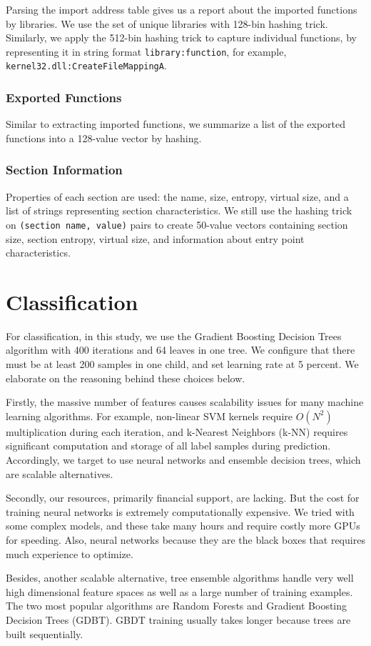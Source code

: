 Parsing the import address table gives us a report about the imported functions by libraries. We use the set of unique libraries with 128-bin hashing trick. Similarly, we apply the 512-bin hashing trick to capture individual functions, by representing
it in string format \verb|library:function|, for example, \verb|kernel32.dll:CreateFileMappingA|.

\subsubsection{Exported Functions}

Similar to extracting imported functions, we summarize a list of the exported functions into a 128-value vector by hashing.

\subsubsection{Section Information}

Properties of each section are used: the name, size, entropy, virtual size, and a list of strings representing section characteristics. We still use the hashing trick on \verb|(section name, value)| pairs to create 50-value vectors containing section size, section entropy, virtual size, and information about entry point characteristics.

\section{Classification}
 
For classification, in this study, we use the Gradient Boosting Decision Trees algorithm with 400 iterations and 64 leaves in one tree. We configure that there must be at least 200 samples in one child, and set learning rate at 5 percent. We elaborate on the reasoning behind these choices below.

Firstly, the massive number of features causes scalability issues for many machine learning algorithms.
 For example, non-linear SVM kernels require $O(N^2)$ multiplication during each iteration, and k-Nearest Neighbors (k-NN) requires significant computation and storage of all label samples during prediction. Accordingly, we target to use neural networks and ensemble decision trees, which are scalable alternatives.

Secondly, our resources, primarily financial support, are lacking. 
But the cost for training neural networks is extremely computationally expensive. 
We tried with some complex models, and these take many hours and require costly more GPUs for speeding. 
Also, neural networks because they are the black boxes that requires much experience to optimize.

Besides, another scalable alternative, tree ensemble algorithms handle very well high dimensional feature spaces as well as a large number of training examples. The two most popular algorithms are Random Forests and Gradient Boosting Decision Trees (GDBT). GBDT training usually takes longer because trees are built sequentially.